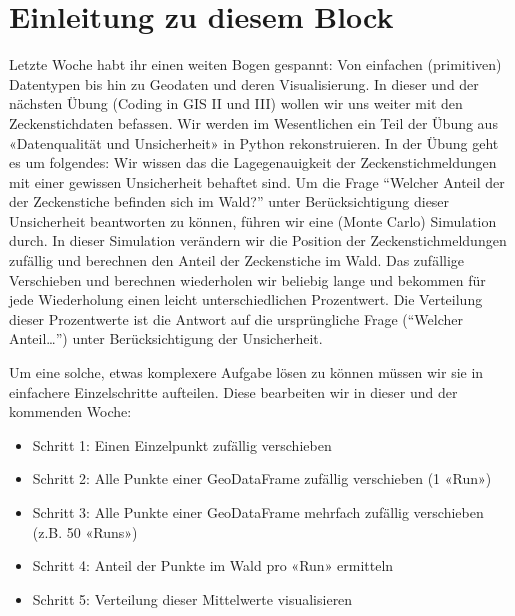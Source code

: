 \documentclass[letterpaper,10pt,english]{sphinxmanual}
\begin{document}
\begin{sphinxVerbatim}[commandchars=\\\{\}]
\end{sphinxVerbatim}


\chapter{Einleitung zu diesem Block}
\label{\detokenize{02_01_Einleitung:einleitung-zu-diesem-block}}\label{\detokenize{02_01_Einleitung::doc}}
Letzte Woche habt ihr einen weiten Bogen gespannt: Von einfachen (primitiven) Datentypen bis hin zu Geodaten und deren Visualisierung. In dieser und der nächsten Übung (Coding in GIS II und III) wollen wir uns weiter mit den Zeckenstichdaten befassen. Wir werden im Wesentlichen ein Teil der Übung aus «Datenqualität und Unsicherheit» in Python rekonstruieren.
In der Übung geht es um folgendes: Wir wissen das die Lagegenauigkeit der Zeckenstichmeldungen mit einer gewissen Unsicherheit behaftet sind. Um die Frage “Welcher Anteil der der Zeckenstiche befinden sich im Wald?” unter Berücksichtigung dieser Unsicherheit beantworten zu können, führen wir eine (Monte Carlo) Simulation durch.
In dieser Simulation verändern wir die Position der Zeckenstichmeldungen zufällig und berechnen den Anteil der Zeckenstiche im Wald. Das zufällige Verschieben und berechnen wiederholen wir beliebig lange und bekommen für jede Wiederholung einen leicht unterschiedlichen Prozentwert. Die Verteilung dieser Prozentwerte ist die Antwort auf die ursprüngliche Frage (“Welcher Anteil…”) unter Berücksichtigung der Unsicherheit.

Um eine solche, etwas komplexere Aufgabe lösen zu können müssen wir sie in einfachere Einzelschritte aufteilen. Diese bearbeiten wir in dieser und der kommenden Woche:
\begin{itemize}
\item {} 
Schritt 1: Einen Einzelpunkt zufällig verschieben

\item {} 
Schritt 2: Alle Punkte einer GeoDataFrame zufällig verschieben (1 «Run»)

\item {} 
Schritt 3: Alle Punkte einer GeoDataFrame mehrfach zufällig verschieben (z.B. 50 «Runs»)

\item {} 
Schritt 4: Anteil der Punkte im Wald pro «Run» ermitteln

\item {} 
Schritt 5: Verteilung dieser Mittelwerte visualisieren

\end{itemize}
\end{document}
